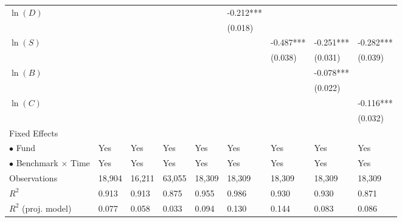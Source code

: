 \documentclass[openany]{book}
\theoremstyle{definition}
\theoremstyle{definition}
\theoremstyle{definition}
\theoremstyle{remark}
\begin{document}
\begin{table}[ht]
\begin{tabularx}{0.975\textwidth}{lYYYYYYYY}
  $\ln(D)$ &  &  &  &  & -0.212*** &  &  &  \\ 
   &  &  &  &  & (0.018) &  &  &  \\ 
  $\ln(S)$ &  &  &  &  &  & -0.487*** & -0.251*** & -0.282*** \\ 
   &  &  &  &  &  & (0.038) & (0.031) & (0.039) \\ 
  $\ln(B)$ &  &  &  &  &  &  & -0.078*** &  \\ 
   &  &  &  &  &  &  & (0.022) &  \\ 
  $\ln(C)$ &  &  &  &  &  &  &  & -0.116*** \\ 
   &  &  &  &  &  &  &  & (0.032) \\ 
  Fixed Effects &  &  &  &  &  &  &  &  \\ 
  $\bullet$ Fund & Yes & Yes & Yes & Yes & Yes & Yes & Yes & Yes \\ 
  $\bullet$ Benchmark $\times$ Time & Yes & Yes & Yes & Yes & Yes & Yes & Yes & Yes \\ 
  Observations & 18,904 & 16,211 & 63,055 & 18,309 & 18,309 & 18,309 & 18,309 & 18,309 \\ 
  $R^2$ & 0.913 & 0.913 & 0.875 & 0.955 & 0.986 & 0.930 & 0.930 & 0.871 \\ 
  $R^2$ (proj. model) & 0.077 & 0.058 & 0.033 & 0.094 & 0.130 & 0.144 & 0.083 & 0.086 \\ 
   \bottomrule
\end{tabularx}
\endgroup
\end{table}
\end{document}
